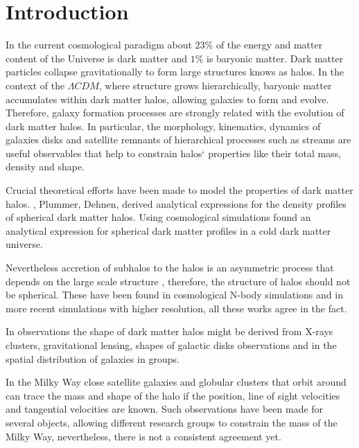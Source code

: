 \label{sec:intro}
\section{Introduction}

In the current cosmological paradigm about 23\% of the energy and matter
content of the Universe is dark matter and $1\%$ is baryonic matter.
Dark matter particles collapse gravitationally to form large structures
knows as halos. In the context of the $\Lambda CDM$, where structure grows
hierarchically, baryonic matter accumulates within dark matter halos,
allowing galaxies to form and evolve. Therefore, galaxy formation processes
are strongly related with the evolution of dark matter halos. In particular,
the morphology, kinematics, dynamics of galaxies disks and satellite
remnants of hierarchical processes such as streams are useful observables
that help to constrain halos` properties like their total mass, density and shape.


Crucial theoretical efforts have been made to model the properties of dark
matter halos. \citep{Hernquist90}, Plummer, Dehnen, derived analytical expressions for
the density profiles of spherical dark matter halos. Using cosmological
simulations \citep{Navarro96, Navarro97} found an analytical expression for spherical
dark matter profiles in a cold dark matter universe. 

Nevertheless accretion of subhalos to the halos is an asymmetric
process that depends on the large scale structure \citep{Tormen97,Colberg99},
therefore, the structure of halos should not be spherical.
These have been found in cosmological N-body simulations \citep{Barnes87,
Frenk88, Dubinski91, Warren92, Tormen97, Thomas98} and in more recent
simulations with higher resolution, all these works agree in the fact.


In observations the shape of dark matter halos might be derived from
X-rays clusters, gravitational lensing, shapes of galactic disks 
observations and in the spatial distribution of galaxies in groups.


In the Milky Way close satellite galaxies and globular clusters that orbit 
around can trace the mass and shape of the halo if the position, line of
sight velocities and tangential velocities are known. Such observations
have been made for several objects, allowing different
research groups to constrain the mass of the Milky Way, nevertheless, there is not a consistent
agreement yet. %


